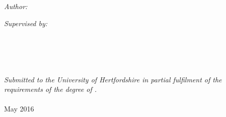 \documentclass[11pt, oneside]{Thesis} %
\begin{document}
\begin{titlepage}
\begin{center}

\textsc{}\\[1.5cm] %
\textsc{}\\[0.5cm] %

\textsc{}\\[0.4cm]
{\huge \bfseries \ttitle}\\[0.4cm] %
\textsc{}\\[1.5cm]
 
\begin{minipage}{0.4\textwidth}
\begin{flushleft} \large
\emph{Author:}\\
{\authornames} %
\end{flushleft}
\end{minipage}
\begin{minipage}{0.4\textwidth}
\begin{flushright} \large
\emph{Supervised by:} \\
{\supname} %
\end{flushright}
\end{minipage}\\[3cm]


\groupname\\\deptname\\\univname\\[2cm] %
\large \textit{Submitted to the University of Hertfordshire in partial fulfilment of the requirements of the degree of \degreename.}\\[0.3cm] %
\textit{}\\[0.4cm]
 
{\large May 2016}\\[4cm] %
 
\vfill
\end{center}

\end{titlepage}

\clearpage %

\end{document}
